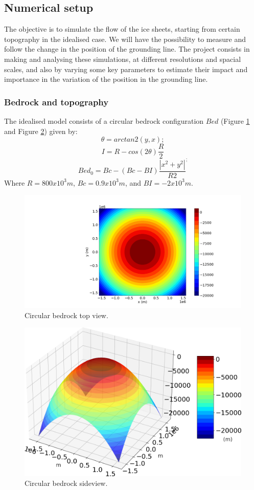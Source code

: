 \documentclass[a4paper,12pt]{article}
\begin{document}
\subsection{Numerical setup}
The objective is to simulate the flow of the ice sheets, starting from certain topography in the idealised case. We will have the possibility to measure and follow the change in the position of the grounding line. The project consists in making and analysing these simulations, at different resolutions and spacial scales, and also by varying some key parameters to estimate their impact and importance in the variation of the position in the grounding line. 
\subsubsection{Bedrock and topography}
The idealised model consists of a circular bedrock configuration $Bed$ (Figure \ref{circular_topo_top} and Figure \ref{circular_topo_jet}) given by:
\begin{equation}
	\theta=arctan2(y,x);
\end{equation}
\begin{equation}
	I=R-cos(2\theta)\frac{R}{2}
\end{equation}
\begin{equation}
	Bed_0=Bc-(Bc-BI)\frac{|x^2+y^2|}{R2}^;
\end{equation}
Where $R=800x10^3 m$, $Bc=0.9 x 10^3 m$, and $BI=-2 x 10^3 m$. 
\begin{figure}[!h]
	\centering
	\includegraphics[width=0.7\linewidth]{../fig/circular_topo_top}
	\caption{Circular bedrock top view.}
	\label{circular_topo_top}
\end{figure}
\begin{figure}[!h]
	\centering
	\includegraphics[width=0.7\linewidth]{../fig/circular_topo_jet}
	\caption{Circular bedrock sideview.}
	\label{circular_topo_jet}
\end{figure}
\end{document}
